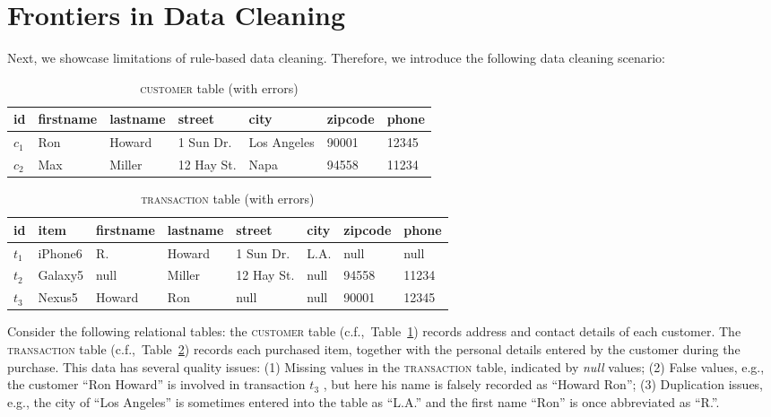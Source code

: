 \section{Frontiers in Data Cleaning}

Next, we showcase limitations of rule-based data cleaning. Therefore, we introduce the following data cleaning scenario:
\label{sec:example}
\begin{table}[h]\footnotesize
\scriptsize
\begin{tabular}{lllllll} \toprule 
\textbf{id} &  \textbf{firstname} & \textbf{lastname} & \textbf{street} & \textbf{city} & \textbf{zipcode} & \textbf{phone} \\ \midrule
$c_1$ & Ron & Howard & 1 Sun Dr. & Los Angeles & 90001 & 12345 \\
$c_2$ & Max & Miller & 12 Hay St. & Napa & 94558 & 11234 \\ \bottomrule
\end{tabular}
\vspace{-1em}
\caption{\textsc{customer} table (with errors)}
\label{tab:cust}
\end{table}

\begin{table}[h]\footnotesize
\scriptsize
\begin{tabular}{llllllll} \toprule 
\textbf{id} & \textbf{item} &  \textbf{firstname} & \textbf{lastname} & \textbf{street} & \textbf{city} & \textbf{zipcode} & \textbf{phone} \\ \midrule
$t_1$ & iPhone6 & R. & Howard & 1 Sun Dr. & L.A. & null & null \\
$t_2$ & Galaxy5 & null & Miller & 12 Hay St. & null & 94558 & 11234 \\
$t_3$ & Nexus5 & Howard & Ron & null & null & 90001 & 12345 \\ \bottomrule
\end{tabular}
\vspace{-1em}
\caption{\textsc{transaction} table (with errors)}
\label{tab:trans}
\end{table}


Consider the following relational tables: the \textsc{customer} table (c.f.,~Table~\ref{tab:cust}) records address and contact details of each customer. The \textsc{transaction} table (c.f.,~Table~\ref{tab:trans}) records each purchased item, together with the personal details entered by the customer during the purchase. 
This data has several quality issues: (1) Missing values in the \textsc{transaction} table, indicated by \emph{null} values; (2) False values, e.g.,  the customer ``Ron Howard'' is involved in transaction $t_3$ , but here his name is falsely recorded as ``Howard Ron''; (3) Duplication issues, e.g., the city of ``Los Angeles'' is sometimes entered into the table as ``L.A.'' and the first name ``Ron'' is once abbreviated as ``R.''. 


